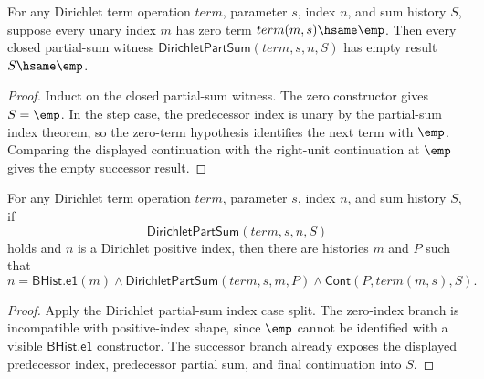 \begin{theorem}
\label{thm:lfunction-dirichlet-part-sum-zero-terms-result-empty}
For any Dirichlet term operation $term$, parameter $s$, index $n$, and sum
history $S$, suppose every unary index $m$ has zero term
$term(m,s)\hsame\emp$. Then every closed partial-sum witness
$\mathsf{DirichletPartSum}(term,s,n,S)$ has empty result $S\hsame\emp$.
\end{theorem}
\begin{proof}
Induct on the closed partial-sum witness. The zero constructor gives
$S=\emp$. In the step case, the predecessor index is unary by the partial-sum
index theorem, so the zero-term hypothesis identifies the next term with
$\emp$. Comparing the displayed continuation with the right-unit continuation
at $\emp$ gives the empty successor result.
\end{proof}

\begin{theorem}
\label{thm:lfunction-dirichlet-partsum-positive-index-previous-exists}
For any Dirichlet term operation $term$, parameter $s$, index $n$, and sum
history $S$, if
$$
\mathsf{DirichletPartSum}(term,s,n,S)
$$
holds and $n$ is a Dirichlet positive index, then there are histories $m$ and
$P$ such that
$$
n=\mathsf{BHist.e1}(m)\land
\mathsf{DirichletPartSum}(term,s,m,P)\land
\mathsf{Cont}(P,term(m,s),S).
$$
\end{theorem}
\begin{proof}
Apply the Dirichlet partial-sum index case split. The zero-index branch is
incompatible with positive-index shape, since $\emp$ cannot be identified with
a visible $\mathsf{BHist.e1}$ constructor. The successor branch already
exposes the displayed predecessor index, predecessor partial sum, and final
continuation into $S$.
\end{proof}

